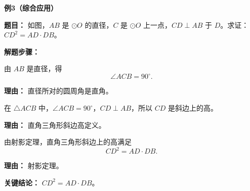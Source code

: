 \begin{examplebox}
	\medskip
	\textbf{\textcolor{CExample}{例3（综合应用）}}

	\textbf{\textcolor{CExample}{题目：}}
	如图，$AB$ 是 $\odot O$ 的直径，$C$ 是 $\odot O$ 上一点，$CD \perp AB$ 于 $D$。求证：$CD^2 = AD \cdot DB$。

	\textbf{\textcolor{CExample}{解题步骤：}}
	\begin{description}[style=nextline, leftmargin=2.8em, labelsep=0.5em, itemsep=0.45em]
		\item[\textbf{第一步（应用直径定理）：}] 由 $AB$ 是直径，得
			\[
				\angle ACB = 90^\circ.
			\]
			\par\textbf{理由：} 直径所对的圆周角是直角。
		\item[\textbf{第二步（直角三角形高）：}] 在 $\triangle ACB$ 中，$\angle ACB = 90^\circ$，$CD \perp AB$，所以 $CD$ 是斜边上的高。
			\par\textbf{理由：} 直角三角形斜边高定义。
		\item[\textbf{第三步（射影定理）：}] 由射影定理，直角三角形斜边上的高满足
			\[
				CD^2 = AD \cdot DB.
			\]
			\par\textbf{理由：} 射影定理。
	\end{description}

	\textbf{\textcolor{CExample}{关键结论：}}
	$CD^2 = AD \cdot DB$。
\end{examplebox}
